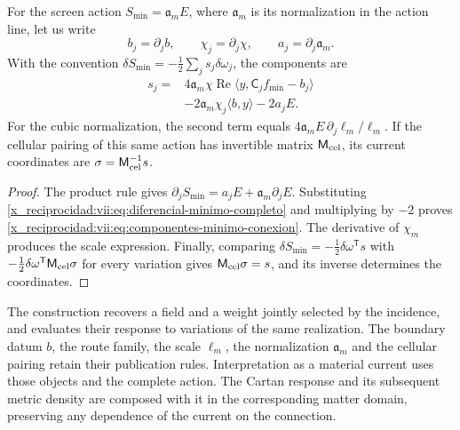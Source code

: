 \begin{theorem}
\label{x_reciprocidad:vii:thm:componentes-minimo-conexion}
For the screen action \(S_{\min}=\mathfrak a_m E\), where \(\mathfrak a_m\) is its normalization in the action line, let us write
\[
 b_j=\partial_jb,\qquad \chi_j=\partial_j\chi,
 \qquad a_j=\partial_j\mathfrak a_m.
\]
With the convention \(\delta S_{\min}=-\tfrac12\sum_j s_j\delta\omega_j\),
the components are
\begin{equation}
 \begin{split}
 s_j={}&4\mathfrak a_m\chi\operatorname{Re}
             \langle y,\mathsf C_jf_{\min}-b_j\rangle\\
      &-2\mathfrak a_m\chi_j\langle b,y\rangle-2a_jE.
 \end{split}
 \label{x_reciprocidad:vii:eq:componentes-minimo-conexion}
\end{equation}
For the cubic normalization, the second term equals \(4\mathfrak a_m E\,\partial_j\ell_m/\ell_m\). If the cellular pairing of this same action has invertible matrix \(\mathsf M_{\rm cel}\), its current coordinates are \(\sigma=\mathsf M_{\rm cel}^{-1}s\).
\end{theorem}

\begin{proof}
The product rule gives \(\partial_jS_{\min}=a_jE+\mathfrak a_m\partial_jE\). Substituting \eqref{x_reciprocidad:vii:eq:diferencial-minimo-completo} and multiplying by \(-2\) proves \eqref{x_reciprocidad:vii:eq:componentes-minimo-conexion}. The derivative of \(\chi_m\) produces the scale expression. Finally, comparing \(\delta S_{\min}=-\tfrac12\delta\omega^{\mathsf T}s\) with \(-\tfrac12\delta\omega^{\mathsf T}\mathsf M_{\rm cel}\sigma\) for every variation gives \(\mathsf M_{\rm cel}\sigma=s\), and its inverse determines the coordinates.
\end{proof}

The construction recovers a field and a weight jointly selected
by the incidence, and evaluates their response to variations of the same
realization. The boundary datum \(b\), the route family, the scale
\(\ell_m\), the normalization \(\mathfrak a_m\) and the cellular
pairing retain their publication rules. Interpretation as a
material current uses those objects and the complete action. The
Cartan response and its subsequent metric density are composed with
it in the corresponding matter domain, preserving any
dependence of the current on the connection.

